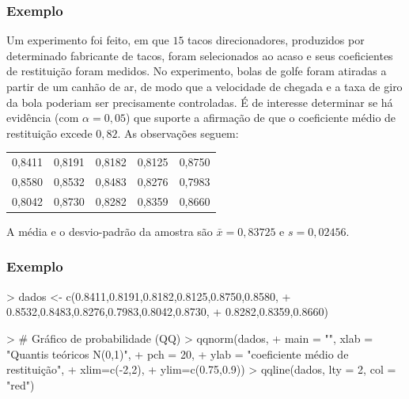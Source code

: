 \documentclass[14pt,aspectratio=1610]{beamer}
\newcommand{\bx}{\ensuremath{\bar{x}}}
\begin{document}
\begin{frame}{}
\frametitle{Exemplo}
\begin{block}{}
\justifying
Um experimento foi feito, em que $15$ tacos direcionadores, produzidos por determinado fabricante de tacos, foram selecionados ao acaso e seus coeficientes de 
restituição foram medidos. No experimento, bolas de golfe foram atiradas a partir de um canhão de ar, de modo que a velocidade de chegada e a taxa de giro da bola 
poderiam ser precisamente controladas. É de interesse determinar se há evidência (com $\alpha = 0,05$) que suporte a afirmação de que o coeficiente médio de restituição 
excede $0,82.$ As observações seguem:
\begin{table}[]
\begin{tabular}{ccccc}
0,8411 &0,8191 &0,8182 &0,8125 &0,8750 \\
0,8580 &0,8532 &0,8483 &0,8276 &0,7983 \\
0,8042 &0,8730 &0,8282 &0,8359 &0,8660 
\end{tabular}
\end{table}
A média e o desvio-padrão da amostra são $\bx = 0,83725$ e $s = 0,02456.$
\end{block}
\end{frame}

\begin{frame}[fragile]{}
\frametitle{Exemplo}
\begin{block}{}
\begin{Schunk}
\begin{Sinput}
> dados <- c(0.8411,0.8191,0.8182,0.8125,0.8750,0.8580,
+            0.8532,0.8483,0.8276,0.7983,0.8042,0.8730,
+            0.8282,0.8359,0.8660)
\end{Sinput}
\end{Schunk}
\begin{Schunk}
\begin{Sinput}
> # Gráfico de probabilidade (QQ)
> qqnorm(dados, 
+        main = "", xlab = "Quantis teóricos N(0,1)", 
+        pch = 20,
+        ylab = "coeficiente médio de restituição",
+        xlim=c(-2,2),
+        ylim=c(0.75,0.9))
> qqline(dados, lty = 2, col = "red")
\end{Sinput}
\end{Schunk}
\end{block}
\end{frame}
\end{document}

